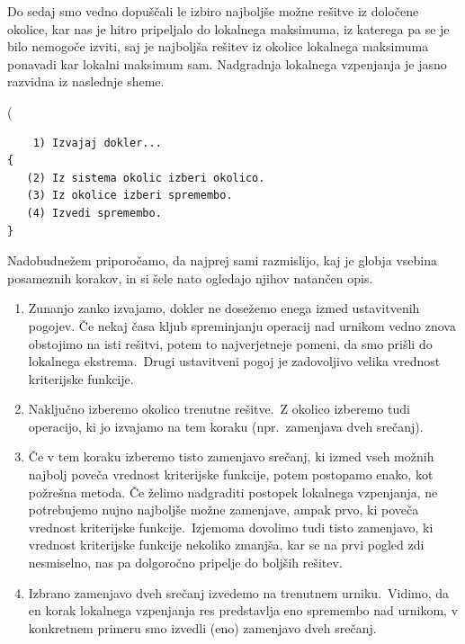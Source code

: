 \documentclass[a4paper,10pt]{article}
\begin{document}
Do sedaj smo vedno dopuščali le izbiro najboljše možne rešitve iz določene okolice, kar nas
je hitro pripeljalo do lokalnega maksimuma, iz katerega pa se je bilo nemogoče izviti, saj
je najboljša rešitev iz okolice lokalnega maksimuma ponavadi kar lokalni maksimum sam.
Nadgradnja lokalnega vzpenjanja je jasno razvidna iz naslednje sheme.

(\begin{verbatim}
	1) Izvajaj dokler...
{
   (2) Iz sistema okolic izberi okolico.
   (3) Iz okolice izberi spremembo.
   (4) Izvedi spremembo.
}
\end{verbatim}

Nadobudnežem priporočamo, da najprej sami razmislijo, kaj je globja vsebina posameznih
korakov, in si šele nato ogledajo njihov natančen opis.
%
   
   \begin{enumerate}
      \item Zunanjo zanko izvajamo, dokler ne dosežemo enega izmed ustavitvenih pogojev.
      Če nekaj časa kljub spreminjanju operacij nad urnikom vedno znova obstojimo na isti
      rešitvi, potem to najverjetneje pomeni, da smo prišli do lokalnega ekstrema.\ Drugi
      ustavitveni pogoj je zadovoljivo velika vrednost kriterijske funkcije.
   
      \item Naključno izberemo okolico trenutne rešitve.\ Z okolico izberemo tudi operacijo,
      ki jo izvajamo na tem koraku (npr.\ zamenjava dveh srečanj).
   
      \item Če v tem koraku izberemo tisto zamenjavo srečanj, ki izmed vseh možnih najbolj
      poveča vrednost kriterijske funkcije, potem postopamo enako, kot požrešna metoda. Če
      želimo nadgraditi postopek lokalnega vzpenjanja, ne potrebujemo nujno najboljše možne
      zamenjave, ampak prvo, ki poveča vrednost kriterijske funkcije.\ Izjemoma dovolimo tudi
      tisto zamenjavo, ki vrednost kriterijske funkcije nekoliko zmanjša, kar se na prvi
      pogled zdi nesmiselno, nas pa dolgoročno pripelje do boljših rešitev.
   
      \item Izbrano zamenjavo dveh srečanj izvedemo na trenutnem urniku.\ Vidimo, da en korak
      lokalnega vzpenjanja res predstavlja eno spremembo nad urnikom, v konkretnem primeru
      smo izvedli (eno) zamenjavo dveh srečanj.
   \end{enumerate}
\end{document}
